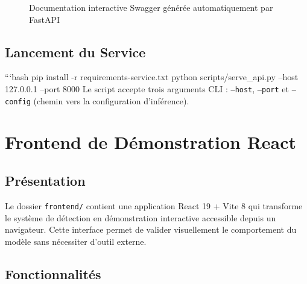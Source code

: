\documentclass{rapportENSIAS}
\newcommand{\projectpath}[1]{\texttt{#1}}
\begin{document}
\begin{figure}[H]
\centering
{}
\caption{Documentation interactive Swagger générée automatiquement par FastAPI}
\label{fig:swagger_ui}
\end{figure}

\subsection{Lancement du Service}

```bash
pip install -r requirements-service.txt
python scripts/serve_api.py --host 127.0.0.1 --port 8000
Le script accepte trois arguments CLI : \texttt{--host}, \texttt{--port}
et \texttt{--config} (chemin vers la configuration d'inférence).

\section{Frontend de Démonstration React}

\subsection{Présentation}

Le dossier \projectpath{frontend/} contient une application React 19 + Vite 8
qui transforme le système de détection en démonstration interactive accessible
depuis un navigateur. Cette interface permet de valider visuellement le
comportement du modèle sans nécessiter d'outil externe.

\subsection{Fonctionnalités}
\end{document}
